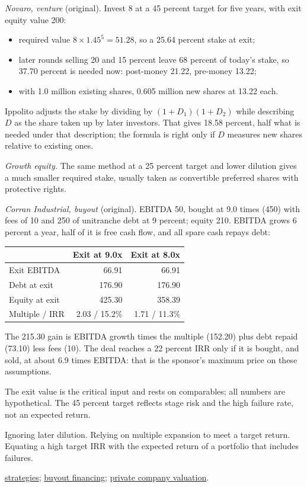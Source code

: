 \begin{qfmethod}
 \emph{Novaro, venture} (original). Invest 8 at a 45 percent target for five years, with exit equity value 200:
\begin{itemize}
\item required value $8\times1.45^5=51.28$, so a 25.64 percent stake at exit;
\item later rounds selling 20 and 15 percent leave 68 percent of today's stake, so 37.70 percent is needed now: post-money 21.22, pre-money 13.22;
\item with 1.0 million existing shares, 0.605 million new shares at 13.22 each.
\end{itemize}
Ippolito adjusts the stake by dividing by $(1+D_1)(1+D_2)$ while describing $D$ as the share taken up by later investors. That gives 18.58 percent, half what is needed under that description; the formula is right only if $D$ measures new shares relative to existing ones.

\emph{Growth equity.} The same method at a 25 percent target and lower dilution gives a much smaller required stake, usually taken as convertible preferred shares with protective rights.

\emph{Corran Industrial, buyout} (original). EBITDA 50, bought at 9.0 times (450) with fees of 10 and 250 of unitranche debt at 9 percent; equity 210. EBITDA grows 6 percent a year, half of it is free cash flow, and all spare cash repays debt:
\begin{center}\small
\begin{tabular}{@{}lrr@{}}
\toprule
 & Exit at 9.0x & Exit at 8.0x \\
\midrule
Exit EBITDA & 66.91 & 66.91 \\
Debt at exit & 176.90 & 176.90 \\
Equity at exit & 425.30 & 358.39 \\
Multiple / IRR & 2.03 / 15.2\% & 1.71 / 11.3\% \\
\bottomrule
\end{tabular}
\end{center}
The 215.30 gain is EBITDA growth times the multiple (152.20) plus debt repaid (73.10) less fees (10). The deal reaches a 22 percent IRR only if it is bought, and sold, at about 6.9 times EBITDA: that is the sponsor's maximum price on these assumptions.

 The exit value is the critical input and rests on comparables; all numbers are hypothetical. The 45 percent target reflects stage risk and the high failure rate, not an expected return.

 Ignoring later dilution. Relying on multiple expansion to meet a target return. Equating a high target IRR with the expected return of a portfolio that includes failures.

 \hyperref[meth:private-equity-strategies]{strategies}; \hyperref[meth:private-debt-financing-structures]{buyout financing}; \hyperref[meth:private-company-valuation]{private company valuation}.

\end{qfmethod}
